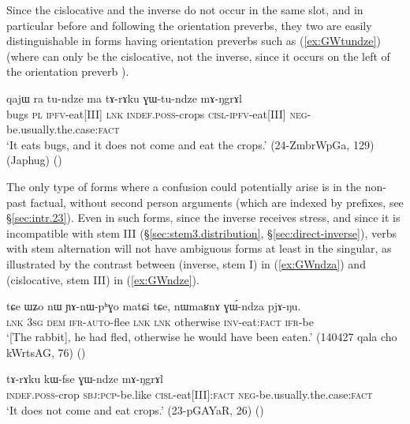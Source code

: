 Since the cislocative and the inverse do not occur in the same slot, and in particular before and following the orientation preverbs, they two are easily distinguishable in forms having orientation preverbs such as (\ref{ex:GWtundze}) (where  can only be the cislocative, not the inverse, since it occurs on the left of the orientation preverb ).

\begin{exe}
\ex \label{ex:GWtundze}
 \gll qajɯ ra tu-ndze ma tɤ-rɤku ɣɯ-tu-ndze mɤ-ŋgrɤl \\
bugs \textsc{pl} \textsc{ipfv}-eat[III] \textsc{lnk} \textsc{indef}.\textsc{poss}-crops   \textsc{cisl}-\textsc{ipfv}-eat[III] \textsc{neg}-be.usually.the.case:\textsc{fact} \\
\glt `It eats bugs, and it does not come and eat the crops.' (24-ZmbrWpGa, 129) (Japhug)
()
\end{exe}

The only type of forms where a confusion could potentially arise is in the non-past factual, without second person arguments (which are indexed by prefixes, see §\ref{sec:intr.23}). Even in such forms, since the inverse receives stress, and since it is incompatible with stem III (§\ref{sec:stem3.distribution}, §\ref{sec:direct-inverse}), verbs with stem alternation will not have ambiguous forms at least in the singular, as illustrated by the contrast between  (inverse, stem I) in (\ref{ex:GWndza}) and  (cislocative, stem III) in (\ref{ex:GWndze}). 

\begin{exe}
\ex \label{ex:GWndza}
 \gll  tɕe ɯʑo nɯ ɲɤ-nɯ-pʰɣo matɕi tɕe, nɯmaʁnɤ ɣɯ́-ndza pjɤ-ŋu. \\
 \textsc{lnk} \textsc{3sg} \textsc{dem} \textsc{ifr}-\textsc{auto}-flee \textsc{lnk} \textsc{lnk} otherwise \textsc{inv}-eat:\textsc{fact} \textsc{ifr}-be \\
\glt `[The rabbit], he had fled, otherwise he would have been eaten.' (140427 qala cho kWrtsAG, 76) ()
\end{exe}

\begin{exe}
\ex \label{ex:GWndze}
 \gll  tɤ-rɤku kɯ-fse ɣɯ-ndze mɤ-ŋgrɤl \\
 \textsc{indef}.\textsc{poss}-crop \textsc{sbj}:\textsc{pcp}-be.like \textsc{cisl}-eat[III]:\textsc{fact} \textsc{neg}-be.usually.the.case:\textsc{fact} \\
 \glt `It does not come and eat crops.' (23-pGAYaR, 26) ()
\end{exe}

